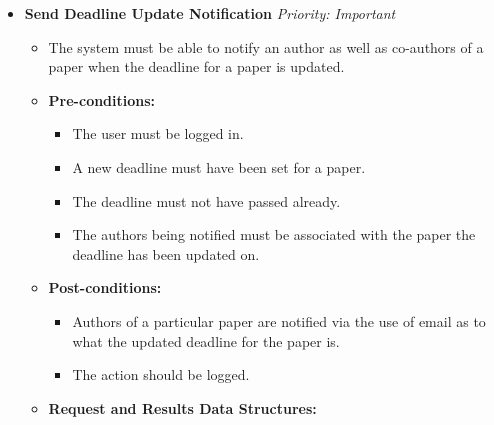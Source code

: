 \documentclass{article}
\begin{document}
\begin{itemize}
					\item \textbf{Send Deadline Update Notification} \hfill \textit{Priority: Important}
					\begin{itemize}
						\item The system must be able to notify an author as well as co-authors of a paper when the deadline for a paper is updated.
						\item \textbf{Pre-conditions:}
						\begin{itemize}
							\item The user must be logged in.
							\item A new deadline must have been set for a paper.
							\item The deadline must not have passed already.
							\item The authors being notified must be associated with the paper the deadline has been updated on.
						\end{itemize}
						\item \textbf{Post-conditions:}
						\begin{itemize}
							\item Authors of a particular paper are notified via the use of email as to what the updated deadline for the paper is.
							\item The action should be logged.
						\end{itemize}
						\item \textbf{Request and Results Data Structures:}
					\end{itemize}
				\end{itemize}
\end{document}
